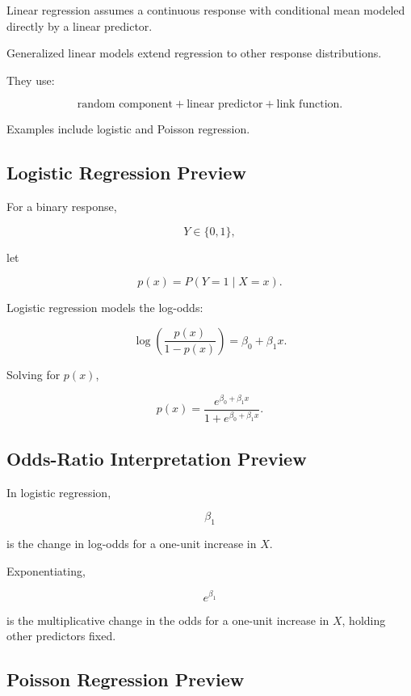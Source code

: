Linear regression assumes a continuous response with conditional mean
modeled directly by a linear predictor.

Generalized linear models extend regression to other response
distributions.

They use:

\[
\boxed{
\text{random component}
+
\text{linear predictor}
+
\text{link function}.
}
\]

Examples include logistic and Poisson regression.

\subsection{Logistic Regression Preview}
\label{subsec:logistic-regression-preview}

For a binary response,

\[
Y\in\{0,1\},
\]

let

\[
p(x)
=
P(Y=1\mid X=x).
\]

Logistic regression models the log-odds:

\[
\boxed{
\log
\left(
\frac{
p(x)
}{
1-p(x)
}
\right)
=
\beta_0+\beta_1x.
}
\]

Solving for \(p(x)\),

\[
\boxed{
p(x)
=
\frac{
e^{\beta_0+\beta_1x}
}{
1+
e^{\beta_0+\beta_1x}
}.
}
\]

\subsection{Odds-Ratio Interpretation Preview}
\label{subsec:odds-ratio-logistic-preview}

In logistic regression,

\[
\beta_1
\]

is the change in log-odds for a one-unit increase in \(X\).

Exponentiating,

\[
\boxed{
e^{\beta_1}
}
\]

is the multiplicative change in the odds for a one-unit increase in
\(X\), holding other predictors fixed.

\subsection{Poisson Regression Preview}
\label{subsec:poisson-regression-preview}

